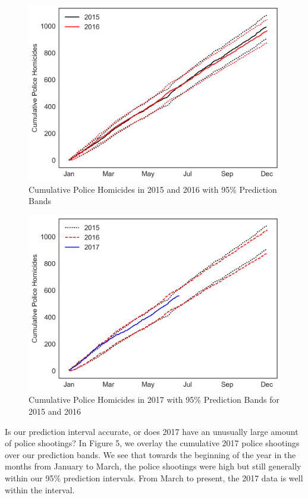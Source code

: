\documentclass[12pt, titlepage]{article}
\begin{document}
\begin{figure}[h]
\centering
\includegraphics[width=\textwidth*2/3]{assets/cumulative_homicides_(ixa).png}
\caption{Cumulative Police Homicides in 2015 and 2016 with 95\% Prediction Bands\cite{washington}}
\end{figure}

\begin{figure}[h!]
\centering
\includegraphics[width=\textwidth*2/3]{assets/cumulative_homicides_(ixb).png}
\caption{Cumulative Police Homicides in 2017 with 95\% Prediction Bands for 2015 and 2016\cite{washington}}
\end{figure}

Is our prediction interval accurate, or does 2017 have an unusually large amount of police shootings? In Figure 5, we overlay the cumulative 2017 police shootings over our prediction bands. We see that towards the beginning of the year in the months from January to March, the police shootings were high but still generally within our 95\% prediction intervals. From March to present, the 2017 data is well within the interval.
\end{document}
